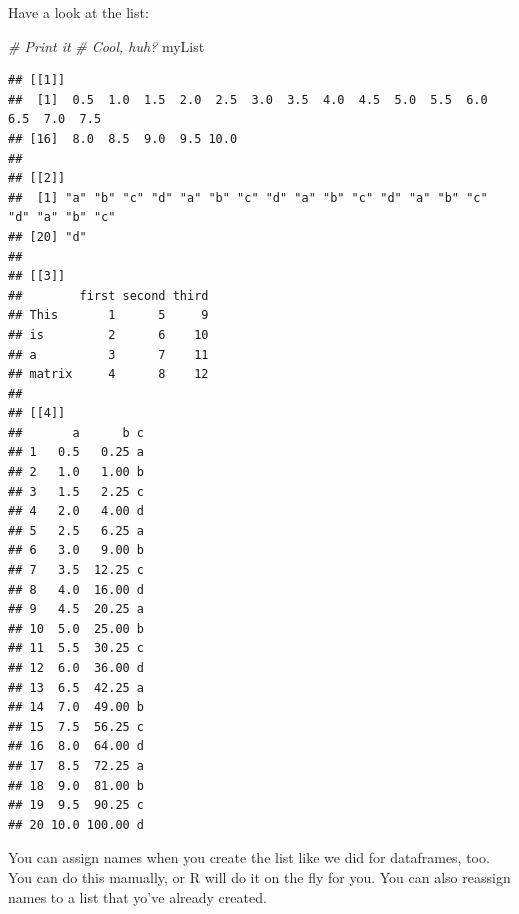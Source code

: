 \documentclass[
]{book}
\newenvironment{Shaded}{\begin{snugshade}}{\end{snugshade}}
\newcommand{\CommentTok}[1]{\textcolor[rgb]{0.56,0.35,0.01}{\textit{#1}}}
\newcommand{\DecValTok}[1]{\textcolor[rgb]{0.00,0.00,0.81}{#1}}
\newcommand{\KeywordTok}[1]{\textcolor[rgb]{0.13,0.29,0.53}{\textbf{#1}}}
\newcommand{\NormalTok}[1]{#1}
\newcommand{\OperatorTok}[1]{\textcolor[rgb]{0.81,0.36,0.00}{\textbf{#1}}}
\newcommand{\StringTok}[1]{\textcolor[rgb]{0.31,0.60,0.02}{#1}}
\begin{document}
Have a look at the list:

\begin{Shaded}
\begin{Highlighting}[]
\CommentTok{# Print it}
\CommentTok{# Cool, huh?}
\NormalTok{myList}
\end{Highlighting}
\end{Shaded}

\begin{verbatim}
## [[1]]
##  [1]  0.5  1.0  1.5  2.0  2.5  3.0  3.5  4.0  4.5  5.0  5.5  6.0  6.5  7.0  7.5
## [16]  8.0  8.5  9.0  9.5 10.0
## 
## [[2]]
##  [1] "a" "b" "c" "d" "a" "b" "c" "d" "a" "b" "c" "d" "a" "b" "c" "d" "a" "b" "c"
## [20] "d"
## 
## [[3]]
##        first second third
## This       1      5     9
## is         2      6    10
## a          3      7    11
## matrix     4      8    12
## 
## [[4]]
##       a      b c
## 1   0.5   0.25 a
## 2   1.0   1.00 b
## 3   1.5   2.25 c
## 4   2.0   4.00 d
## 5   2.5   6.25 a
## 6   3.0   9.00 b
## 7   3.5  12.25 c
## 8   4.0  16.00 d
## 9   4.5  20.25 a
## 10  5.0  25.00 b
## 11  5.5  30.25 c
## 12  6.0  36.00 d
## 13  6.5  42.25 a
## 14  7.0  49.00 b
## 15  7.5  56.25 c
## 16  8.0  64.00 d
## 17  8.5  72.25 a
## 18  9.0  81.00 b
## 19  9.5  90.25 c
## 20 10.0 100.00 d
\end{verbatim}

You can assign names when you create the list like we did for dataframes, too. You can do this manually, or R will do it on the fly for you. You can also reassign names to a list that yo've already created.

\begin{Shaded}
\end{Shaded}
\end{document}
